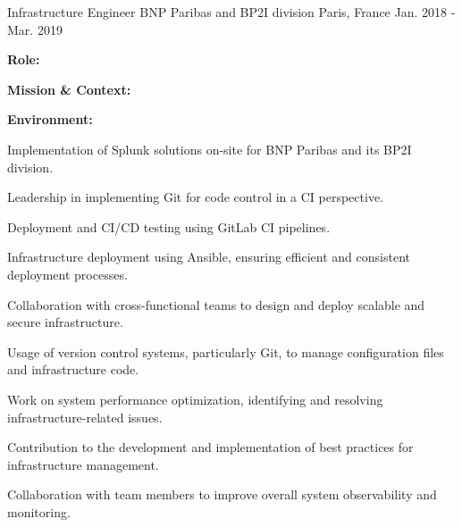 \begin{cventries}
\cventry
{Infrastructure Engineer} %
{BNP Paribas and BP2I division} %
{Paris, France} %
{Jan. 2018 - Mar. 2019} %
{
  \begin{cvitems} %
    \item {\textbf{Role:} }
    \item {\textbf{Mission \& Context:} }
    \item {\textbf{Environment:} }
    \item {Implementation of Splunk solutions on-site for BNP Paribas and its BP2I division.}
    \item {Leadership in implementing Git for code control in a CI perspective.}
    \item {Deployment and CI/CD testing using GitLab CI pipelines.}
    \item {Infrastructure deployment using Ansible, ensuring efficient and consistent deployment processes.}
    \item {Collaboration with cross-functional teams to design and deploy scalable and secure infrastructure.}
    \item {Usage of version control systems, particularly Git, to manage configuration files and infrastructure code.}
    \item {Work on system performance optimization, identifying and resolving infrastructure-related issues.}
    \item {Contribution to the development and implementation of best practices for infrastructure management.}
    \item {Collaboration with team members to improve overall system observability and monitoring.}
  \end{cvitems}
}


\end{cventries}
